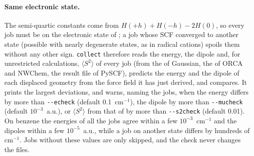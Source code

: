 \paragraph{Same electronic state.} The semi-quartic constants come from
$H(+h)+H(-h)-2H(0)$, so every job must be on the electronic state of
; a job whose SCF converged to another state (possible with
nearly degenerate states, as in radical cations) spoils them without any
other sign. \texttt{collect} therefore reads the energy, the dipole and,
for unrestricted calculations, $\langle S^2\rangle$ of every job (from the
 of Gaussian, the  of ORCA and NWChem, the result
file of PySCF), predicts the energy and the dipole of each displaced
geometry from the force field it has just derived, and compares. It
prints the largest deviations, and warns, naming the jobs, when the energy
differs by more than \texttt{-{}-echeck} (default 0.1~cm$^{-1}$), the
dipole by more than \texttt{-{}-mucheck} (default $10^{-3}$~a.u.), or
$\langle S^2\rangle$ from that of  by more than
\texttt{-{}-s2check} (default 0.01). On benzene the energies of all the
jobs agree within a few $10^{-3}$~cm$^{-1}$ and the dipoles within a few
$10^{-5}$~a.u., while a job on another state differs by hundreds of
cm$^{-1}$. Jobs without these values are only skipped, and the check never
changes the files.

